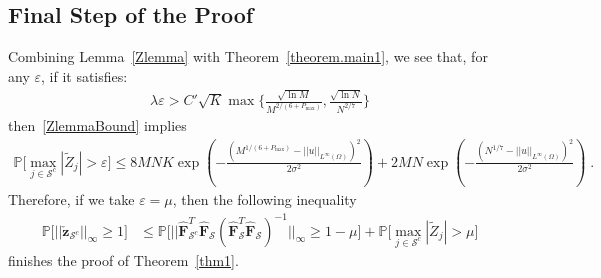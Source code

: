 \documentclass[a4paper,11pt]{article}
\newcommand{\bF}{\mathbf{F}}
\newcommand{\mS}{\mathcal{S}}
\begin{document}
\subsection{Final Step of the Proof}
Combining Lemma~\ref{Zlemma} with Theorem~\ref{theorem.main1}, we see that, for any $\varepsilon$, if it satisfies: 
\begin{align}
\lambda\varepsilon>C'\sqrt{K}\max\{\frac{\sqrt{\ln M}}{M^{2/(6+P_{\max})}},\frac{\sqrt{\ln N}}{N^{2/7}}\}
\end{align}
then~\eqref{ZlemmaBound} implies
\begin{align}
\mathbb{P}\Big[\max_{j\in \mS^c}|\widetilde{Z}_j|>\varepsilon\Big]\leq 8MNK \exp(-\frac{(M^{1/(6+P_{\max})}-||u||_{L^\infty(\Omega)})^2}{2\sigma^2})+2MN \exp(-\frac{(N^{1/7}-||u||_{L^\infty(\Omega)})^2}{2\sigma^2})\;.
\end{align}
Therefore, if we take $\varepsilon= \mu$, then the following inequality
\begin{align}
\mathbb{P}\Big[||\check{\mathbf{z}}_{\mS^c}||_\infty	\geq1\Big]&\leq \mathbb{P}\Big[||\widehat{\bF}_{\mS^c}^T\widehat{\bF}_\mS(\widehat{\bF}_{\mS}^T\widehat{\bF}_\mS)^{-1}||_\infty\geq 1-\mu\Big]+\mathbb{P}\Big[\max_{j\in \mS^c}|\widetilde{Z}_j|>\mu\Big]
\end{align}
finishes the proof of Theorem~\ref{thm1}.
\end{document}
